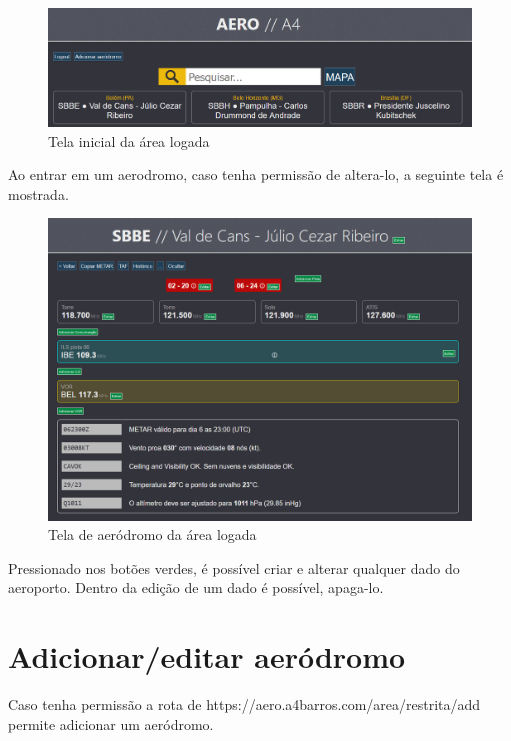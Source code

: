\begin{figure}[ht]
    \begin{center}
    \includegraphics[width=\linewidth]{img/area-restrita-root.png}
    \caption{Tela inicial da área logada}
    \label{fig:max-priv-sys}
    \end{center}
\end{figure}

Ao entrar em um aerodromo, caso tenha permissão de altera-lo, a seguinte tela
é mostrada.

\begin{figure}[ht]
    \begin{center}
    \includegraphics[width=\linewidth]{img/admin-root.png}
    \caption{Tela de aeródromo da área logada}
    \label{fig:max-priv-sys}
    \end{center}
\end{figure}

Pressionado nos botões verdes, é possível criar e alterar qualquer dado do
aeroporto. Dentro da edição de um dado é possível, apaga-lo.

\section {Adicionar/editar aeródromo}
Caso tenha permissão a rota de
https://aero.a4barros.com/area/restrita/add permite adicionar um aeródromo. 

